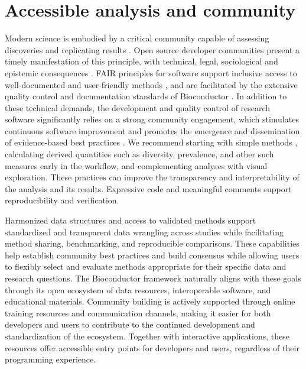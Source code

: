 \documentclass[
  sn-nature,
]{sn-jnl}
\begin{document}
\section{Accessible analysis and community}\label{sec-community}

Modern science is embodied by a critical community capable of assessing
discoveries and replicating results \citep{wootton2016}. Open source
developer communities present a timely manifestation of this principle,
with technical, legal, sociological and epistemic consequences
\citep{hocquet2024}. FAIR principles for software support inclusive
access to well-documented and user-friendly methods \citep{barker2022},
and are facilitated by the extensive quality control and documentation
standards of Bioconductor \citep{huber2015}. In addition to these
technical demands, the development and quality control of research
software significantly relies on a strong community engagement, which
stimulates continuous software improvement and promotes the emergence
and dissemination of evidence-based best practices
\citep{berg2020, barker2022, hocquet2024}. We recommend starting with
simple methods \citep{pelto2025}, calculating derived quantities such as
diversity, prevalence, and other such measures early in the workflow,
and complementing analyses with visual exploration. These practices can
improve the transparency and interpretability of the analysis and its
results. Expressive code and meaningful comments support reproducibility
and verification.

Harmonized data structures and access to validated methods support
standardized and transparent data wrangling across studies while
facilitating method sharing, benchmarking, and reproducible comparisons.
These capabilities help establish community best practices and build
consensus while allowing users to flexibly select and evaluate methods
appropriate for their specific data and research questions. The
Bioconductor framework naturally aligns with these goals through its
open ecosystem of data resources, interoperable software, and
educational materials. Community building is actively supported through
online training resources and communication channels, making it easier
for both developers and users to contribute to the continued development
and standardization of the ecosystem. Together with interactive
applications, these resources offer accessible entry points for
developers and users, regardless of their programming experience.
\end{document}
